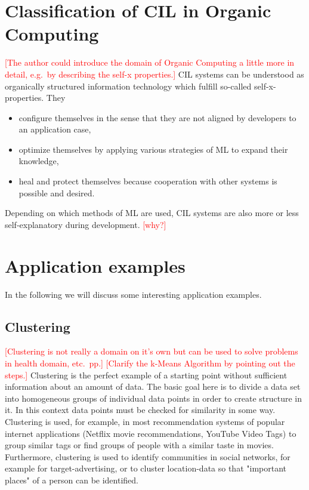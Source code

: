 \documentclass[conference]{IEEEtran}
\newcommand\notes[1]{\textcolor{red}{#1}}
\begin{document}
\section{Classification of CIL in Organic Computing}
\notes{[The author could introduce the domain of Organic Computing a little more in detail, e.g.\ by describing the self-x properties.]}
CIL systems can be understood as organically structured information technology
which fulfill so-called self-x-properties\cite{Organic:schloer}\cite{Organic:schmeck}.
They
\begin{itemize}
    \item configure themselves in the sense that they are not aligned by developers to an application case,
    \item optimize themselves by applying various strategies of ML to expand their knowledge,
    \item heal and protect themselves because cooperation with other systems is possible and desired.
\end{itemize}
Depending on which methods of ML are used, CIL systems are also more or less self-explanatory 
during development\cite{Organic:schloer}.
\notes{[why?]}

\section{Application examples}
In the following we will discuss some interesting application examples.

\subsection{Clustering}
\notes{[Clustering is not really a domain on it's own but can be used to solve problems in health domain, etc.\ pp.]}
\notes{[Clarify the k-Means Algorithm by pointing out the steps.]}
Clustering is the perfect example of a starting point without sufficient information about an amount of data. 
The basic goal here is to divide a data set into homogeneous groups of individual data points in order to create structure in it.
In this context data points must be checked for similarity in some way.
Clustering is used, for example, in most recommendation systems of popular internet applications (Netflix movie recommendations, YouTube Video Tags\cite{YouTube:pasca}) to group similar tags or find groups of people with a similar taste in movies.
Furthermore, clustering is used to identify communities in social networks, for example for target-advertising, or to cluster location-data so that "important places" of a person can be identified\cite{DJ:frankowski}.
\end{document}
